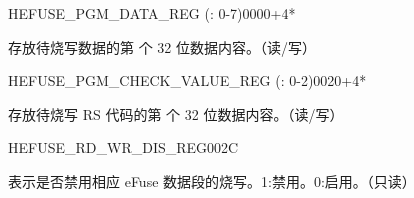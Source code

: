 \begin{register}{H}{EFUSE\_PGM\_DATA\_REG (: 0-7)}{\hexprefix{}0000+4*}\label{regdesc:EFUSEPGMDATANREG}
%
\regnewline%
\begin{regdesc}\begin{reglist}
\label{fielddesc:EFUSEPGMDATAN}\item [EFUSE\_PGM\_DATA\_\regindex{n}] 存放待烧写数据的第  个 32 位数据内容。（读/写）
\end{reglist}\end{regdesc}
\end{register}


\begin{register}{H}{EFUSE\_PGM\_CHECK\_VALUE\_REG (: 0-2)}{\hexprefix{}0020+4*}\label{regdesc:EFUSEPGMCHECKVALUENREG}
%
\regnewline%
\begin{regdesc}\begin{reglist}
\label{fielddesc:EFUSEPGMRSDATAN}\item [EFUSE\_PGM\_RS\_DATA\_\regindex{n}] 存放待烧写 RS 代码的第  个 32 位数据内容。（读/写）
\end{reglist}\end{regdesc}
\end{register}


\begin{register}{H}{EFUSE\_RD\_WR\_DIS\_REG}{\hexprefix{}002C}\label{regdesc:EFUSERDWRDISREG}
%
\regnewline%
\begin{regdesc}\begin{reglist}
\label{fielddesc:EFUSEWRDIS}\item [EFUSE\_WR\_DIS] 表示是否禁用相应 eFuse 数据段的烧写。1:禁用。0:启用。（只读）
\end{reglist}\end{regdesc}
\end{register}


